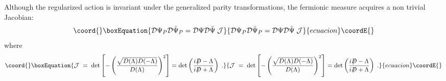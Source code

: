 \documentclass[a4paper,12pt]{article}
\providecommand{\Dcslash}{/\!\!\!\! D}
\begin{document}
Although the regularized action is invariant under the generalized
parity transformations, the fermionic measure acquires a non trivial
Jacobian:
\begin{equation}\coord{}\boxEquation{
\mathcal{D}\Psi_P\mathcal{D}\bar{\Psi}_P =
\mathcal{D}\Psi\mathcal{D}\bar{\Psi}\; {\mathcal J}
}{
\mathcal{D}\Psi_P\mathcal{D}\bar{\Psi}_P =
\mathcal{D}\Psi\mathcal{D}\bar{\Psi}\; {\mathcal J}
}{ecuacion}\coordE{}\end{equation}
where
\begin{equation}\coord{}\boxEquation{
{\mathcal J} \;=\;\det\left[-\left(\frac{\sqrt{D(\Lambda)D(-\Lambda)}}{D(\Lambda)}
  \right)^2\right] = \det\left(
  \frac{i\,\Dcslash -\Lambda}{i\,\Dcslash +\Lambda} \right) \;.
}{
{\mathcal J} \;=\;\det\left[-\left(\frac{\sqrt{D(\Lambda)D(-\Lambda)}}{D(\Lambda)}
  \right)^2\right] = \det\left(
  \frac{i\,\Dcslash -\Lambda}{i\,\Dcslash +\Lambda} \right) \;.
}{ecuacion}\coordE{}\end{equation}
\end{document}
